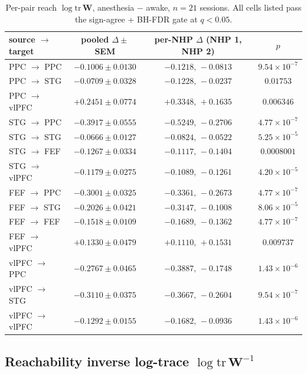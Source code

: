 \begin{table}[h!]
\centering
\small
\caption[Per-pair reach $\log\mathrm{tr}\,\mathbf{W}$]{Per-pair reach $\log\mathrm{tr}\,\mathbf{W}$, anesthesia $-$ awake, $n=21$ sessions. All cells listed pass the sign-agree + BH-FDR gate at $q<0.05$.}
\label{tab:supp-interareal-control-reach-W}
\begin{tabular}{lccc}
\toprule
source $\to$ target & pooled $\Delta\pm$SEM & per-NHP $\Delta$ (NHP 1, NHP 2) & $p$ \\
\midrule
PPC $\to$ PPC   & $-0.1006\pm 0.0130$ & $-0.1218,\,-0.0813$ & $9.54\!\times\!10^{-7}$ \\
PPC $\to$ STG   & $-0.0709\pm 0.0328$ & $-0.1228,\,-0.0237$ & $0.01753$ \\
PPC $\to$ vlPFC & $+0.2451\pm 0.0774$ & $+0.3348,\,+0.1635$ & $0.006346$ \\
STG $\to$ PPC   & $-0.3917\pm 0.0555$ & $-0.5249,\,-0.2706$ & $4.77\!\times\!10^{-7}$ \\
STG $\to$ STG   & $-0.0666\pm 0.0127$ & $-0.0824,\,-0.0522$ & $5.25\!\times\!10^{-5}$ \\
STG $\to$ FEF   & $-0.1267\pm 0.0334$ & $-0.1117,\,-0.1404$ & $0.0008001$ \\
STG $\to$ vlPFC & $-0.1179\pm 0.0275$ & $-0.1089,\,-0.1261$ & $4.20\!\times\!10^{-5}$ \\
FEF $\to$ PPC   & $-0.3001\pm 0.0325$ & $-0.3361,\,-0.2673$ & $4.77\!\times\!10^{-7}$ \\
FEF $\to$ STG   & $-0.2026\pm 0.0421$ & $-0.3147,\,-0.1008$ & $8.06\!\times\!10^{-5}$ \\
FEF $\to$ FEF   & $-0.1518\pm 0.0109$ & $-0.1689,\,-0.1362$ & $4.77\!\times\!10^{-7}$ \\
FEF $\to$ vlPFC & $+0.1330\pm 0.0479$ & $+0.1110,\,+0.1531$ & $0.009737$ \\
vlPFC $\to$ PPC & $-0.2767\pm 0.0465$ & $-0.3887,\,-0.1748$ & $1.43\!\times\!10^{-6}$ \\
vlPFC $\to$ STG & $-0.3110\pm 0.0375$ & $-0.3667,\,-0.2604$ & $9.54\!\times\!10^{-7}$ \\
vlPFC $\to$ vlPFC & $-0.1292\pm 0.0155$ & $-0.1682,\,-0.0936$ & $1.43\!\times\!10^{-6}$ \\
\bottomrule
\end{tabular}
\end{table}

\subsection*{Reachability inverse log-trace $\log\mathrm{tr}\,\mathbf{W}^{-1}$}\label{supp:interareal-control-tab-reach-Winv}

